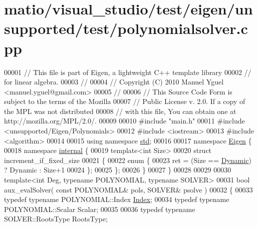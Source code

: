 \hypertarget{matio_2visual__studio_2test_2eigen_2unsupported_2test_2polynomialsolver_8cpp_source}{}\section{matio/visual\+\_\+studio/test/eigen/unsupported/test/polynomialsolver.cpp}
\label{matio_2visual__studio_2test_2eigen_2unsupported_2test_2polynomialsolver_8cpp_source}

\begin{DoxyCode}
00001 \textcolor{comment}{// This file is part of Eigen, a lightweight C++ template library}
00002 \textcolor{comment}{// for linear algebra.}
00003 \textcolor{comment}{//}
00004 \textcolor{comment}{// Copyright (C) 2010 Manuel Yguel <manuel.yguel@gmail.com>}
00005 \textcolor{comment}{//}
00006 \textcolor{comment}{// This Source Code Form is subject to the terms of the Mozilla}
00007 \textcolor{comment}{// Public License v. 2.0. If a copy of the MPL was not distributed}
00008 \textcolor{comment}{// with this file, You can obtain one at http://mozilla.org/MPL/2.0/.}
00009 
00010 \textcolor{preprocessor}{#include "main.h"}
00011 \textcolor{preprocessor}{#include <unsupported/Eigen/Polynomials>}
00012 \textcolor{preprocessor}{#include <iostream>}
00013 \textcolor{preprocessor}{#include <algorithm>}
00014 
00015 \textcolor{keyword}{using namespace }\hyperlink{namespacestd}{std};
00016 
00017 \textcolor{keyword}{namespace }\hyperlink{namespace_eigen}{Eigen} \{
00018 \textcolor{keyword}{namespace }\hyperlink{namespaceinternal}{internal} \{
00019 \textcolor{keyword}{template}<\textcolor{keywordtype}{int} Size>
00020 \textcolor{keyword}{struct }increment\_if\_fixed\_size
00021 \{
00022   \textcolor{keyword}{enum} \{
00023     ret = (Size == \hyperlink{namespace_eigen_ad81fa7195215a0ce30017dfac309f0b2}{Dynamic}) ? Dynamic : Size+1
00024   \};
00025 \};
00026 \}
00027 \}
00028 
00029 
00030 \textcolor{keyword}{template}<\textcolor{keywordtype}{int} Deg, \textcolor{keyword}{typename} POLYNOMIAL, \textcolor{keyword}{typename} SOLVER>
00031 \textcolor{keywordtype}{bool} aux\_evalSolver( \textcolor{keyword}{const} POLYNOMIAL& pols, SOLVER& psolve )
00032 \{
00033   \textcolor{keyword}{typedef} \textcolor{keyword}{typename} POLYNOMIAL::Index \hyperlink{namespace_eigen_a62e77e0933482dafde8fe197d9a2cfde}{Index};
00034   \textcolor{keyword}{typedef} \textcolor{keyword}{typename} POLYNOMIAL::Scalar Scalar;
00035 
00036   \textcolor{keyword}{typedef} \textcolor{keyword}{typename} SOLVER::RootsType    RootsType;

\end{DoxyCode}
